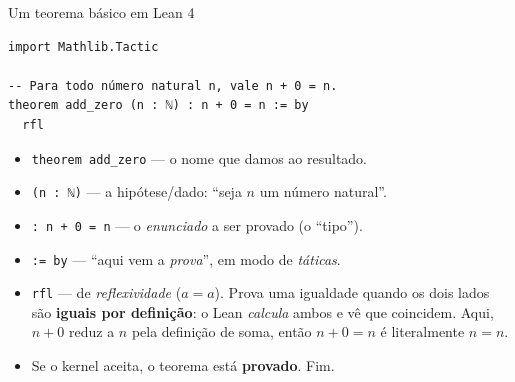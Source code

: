 \documentclass[10pt,aspectratio=169]{beamer}
\newcommand{\hl}[1]{{\color{accent}\textbf{#1}}}
\begin{document}
\begin{frame}[fragile]{Um teorema básico em Lean 4}
  \vspace{-0.2em}
\begin{lstlisting}
import Mathlib.Tactic

-- Para todo número natural n, vale n + 0 = n.
theorem add_zero (n : ℕ) : n + 0 = n := by
  rfl
\end{lstlisting}

  \vspace{0.2em}
  \pause
  \begin{itemize}\small
    \setlength{\itemsep}{0.35em}
    \item \texttt{\color{accent4}theorem add\_zero} --- o nome que
          damos ao resultado.
    \item \texttt{(n : ℕ)} --- a hipótese/dado: ``seja $n$ um número
          natural''.
    \item \texttt{: n + 0 = n} --- o \emph{enunciado} a ser provado
          (o ``tipo'').
    \item \texttt{:= by} --- ``aqui vem a \emph{prova}'', em modo de
          \emph{táticas}.
    \pause
    \item \texttt{\color{accent4}rfl} --- de \emph{reflexividade}
          ($a=a$). Prova uma igualdade quando os dois lados são
          \hl{iguais por definição}: o Lean \emph{calcula} ambos e vê
          que coincidem. Aqui, $n+0$ reduz a $n$ pela definição de
          soma, então $n+0=n$ é literalmente $n=n$.
    \pause
    \item Se o kernel aceita, o teorema está \hl{provado}. Fim.
  \end{itemize}
\end{frame}
\end{document}
